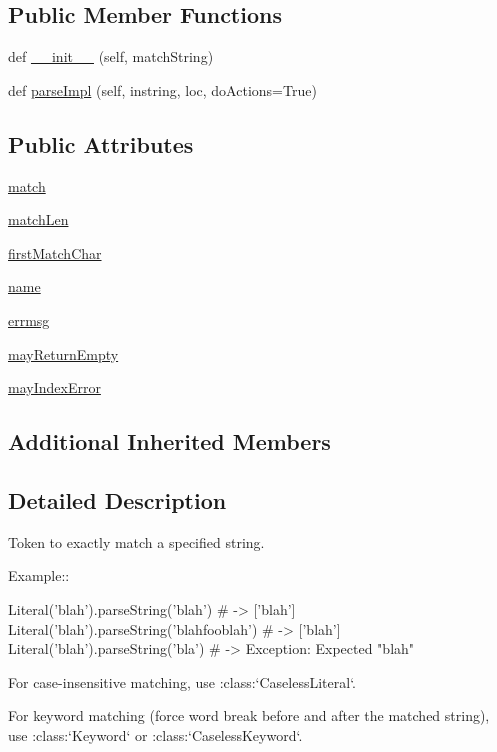 \subsection*{Public Member Functions}
\begin{DoxyCompactItemize}
\item 
def \hyperlink{classpyparsing_1_1Literal_aa7ffdb748d2a2c899d7d779891d9f429}{\+\_\+\+\_\+init\+\_\+\+\_\+} (self, match\+String)
\item 
def \hyperlink{classpyparsing_1_1Literal_a06a69fe8ed5caaf2f729123f3ec30d98}{parse\+Impl} (self, instring, loc, do\+Actions=True)
\end{DoxyCompactItemize}
\subsection*{Public Attributes}
\begin{DoxyCompactItemize}
\item 
\hyperlink{classpyparsing_1_1Literal_a5642fac7301b0ae02f4f7591a4485bf8}{match}
\item 
\hyperlink{classpyparsing_1_1Literal_a6a876e14f816e720eede2ed7b807db78}{match\+Len}
\item 
\hyperlink{classpyparsing_1_1Literal_ac594b6726f1df90af69dceda26b87901}{first\+Match\+Char}
\item 
\hyperlink{classpyparsing_1_1Literal_a48d01fabdbe2ba85e4191118de141afa}{name}
\item 
\hyperlink{classpyparsing_1_1Literal_a7974308dc89ecfc14cdd5d101d69756f}{errmsg}
\item 
\hyperlink{classpyparsing_1_1Literal_a074c101847c2ad122c48e058d4c7c602}{may\+Return\+Empty}
\item 
\hyperlink{classpyparsing_1_1Literal_a7922d9067f1e7fc001c784e697e35345}{may\+Index\+Error}
\end{DoxyCompactItemize}
\subsection*{Additional Inherited Members}


\subsection{Detailed Description}
\begin{DoxyVerb}Token to exactly match a specified string.

Example::

    Literal('blah').parseString('blah')  # -> ['blah']
    Literal('blah').parseString('blahfooblah')  # -> ['blah']
    Literal('blah').parseString('bla')  # -> Exception: Expected "blah"

For case-insensitive matching, use :class:`CaselessLiteral`.

For keyword matching (force word break before and after the matched string),
use :class:`Keyword` or :class:`CaselessKeyword`.
\end{DoxyVerb}
 

